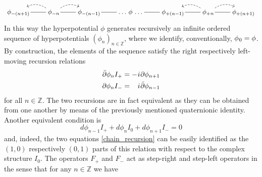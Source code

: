 \documentclass[11pt]{amsart}
\theoremstyle{remark}
\theoremstyle{remark}
\theoremstyle{definition}
\theoremstyle{definition}
\theoremstyle{definition}
\newcommand{\0}{{\scriptstyle 0'}} %
\newcommand{\1}{{\scriptstyle 1'}}
\newcommand{\hp}{\hspace{0.5pt}} %
\newcommand{\noarrow}{\mathord{\begin{tikzpicture}[baseline=-0.03ex, line width=0.3, scale=0.1]
\draw (0,1) -- (9.54,1);
\end{tikzpicture}}}
\begin{document}
\begin{equation*}
\begin{tikzcd}
\phi_{-(n+1)} \!\! \arrow[dash]{r} & \arrow[l, dashed, bend right] \! \phi_{-n} \!\! \arrow[r, dashed, bend left]  \arrow[dash]{r} & \! \phi_{-(n-1)} \!\! \arrow[dash]{r} & {\! \dots \, \phi \, \dots \!} \arrow[dash]{r} & \! \phi_{+(n-1)} \!\! \arrow[dash]{r} & \arrow[l, dashed, bend right] \! \phi_{+n} \!\! \arrow[r, dashed, bend left]  \arrow[dash]{r} & \! \phi_{+(n+1)} 
\end{tikzcd}
\end{equation*}
In this way the hyperpotential $\phi$ generates recursively an infinite ordered sequence of hyperpotentials $(\phi_n )_{n \in \mathbb{Z}}$, where we identify, conventionally, $\phi_{\hp 0} = \phi$.
By construction, the elements of the sequence satisfy the right respectively left-moving recursion relations
\begin{equation} \label{chain_recursion}
\begin{aligned}
\bar{\partial}\phi_n I_+ & = - \hp i\hp \partial \phi_{n+1} \\[0pt]
\partial\phi_n I_- & = \phantom{+} \hp i\hp \bar{\partial} \phi_{n-1} 
\end{aligned}
\end{equation}
for all $n \in \mathbb{Z}$. The two recursions are in fact equivalent as they can be obtained from one another by means of the previously mentioned quaternionic identity. Another equivalent condition is
\begin{equation} \label{chain_recursion_2}
d\phi_{n-1}I_+ + d\phi_n I_0 + d\phi_{n+1} I_- = 0
\end{equation}
and, indeed, the two equations \eqref{chain_recursion} can be easily identified as the $(1,0)$ respectively $(0,1)$ parts of this relation with respect to the complex structure $I_0$. The operators $F_+$ and $F_-$ act as step-right and step-left operators in the sense that for any $n \in \mathbb{Z}$ we have
\end{document}
